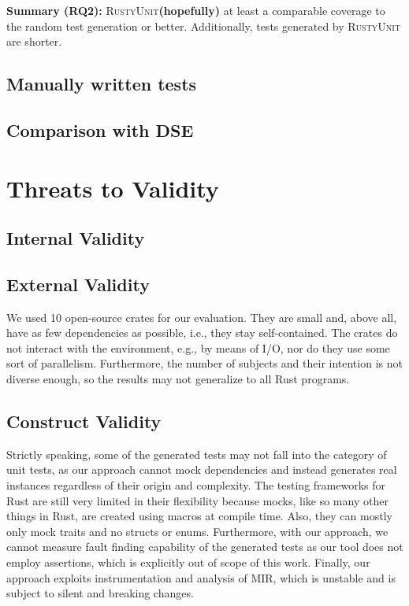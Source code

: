 \documentclass[paper=a4,%
  twoside,%
  BCOR4mm,%
  abstract=true,%
  toc=bibliography,%
  chapterprefix=true,%
  toc=bibliographynumbered,%
  open=right,%
  english,%
  pagesize=pdftex]{scrreprt}
\newcommand{\benchnum}{10\xspace}
\newcommand{\tech}{\textsc{RustyUnit}\xspace}
\newcommand{\mir}{\ac{MIR}\xspace}
\begin{document}
\begin{tcolorbox}
\textbf{Summary (RQ2):} \tech \textbf{(hopefully)} at least a comparable coverage to the random test generation or better. Additionally, tests generated by \tech are shorter. 
\end{tcolorbox}

\subsection{Manually written tests}

\subsection{Comparison with DSE}

\section{Threats to Validity}
\label{sec:threats-to-validity}
\subsection*{Internal Validity}

\subsection*{External Validity}
We used \benchnum open-source crates for our evaluation. They are small and, above all, have as few dependencies as possible, i.e., they stay self-contained. The crates do not interact with the environment, e.g., by means of I/O, nor do they use some sort of parallelism. Furthermore, the number of subjects and their intention is not diverse enough, so the results may not generalize to all Rust programs.

\subsection*{Construct Validity}
Strictly speaking, some of the generated tests may not fall into the category of unit tests, as our approach cannot mock dependencies and instead generates real instances regardless of their origin and complexity. The testing frameworks for Rust are still very limited in their flexibility because mocks, like so many other things in Rust, are created using macros at compile time. Also, they can mostly only mock traits and no structs or enums. Furthermore, with our approach, we cannot measure fault finding capability of the generated tests as our tool does not employ assertions, which is explicitly out of scope of this work. Finally, our approach exploits instrumentation and analysis of \mir, which is unstable and is subject to silent and breaking changes. 
\end{document}
